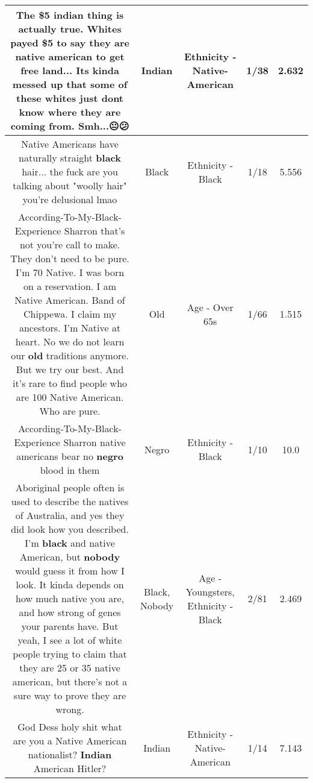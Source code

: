 \documentclass[11pt]{article}
\newlength\mylength
\begin{document}
\begin{center}
\begin{longtable}{|C{.65\mylength}|C{.30\mylength}|C{.12\mylength}|C{.12\mylength}|C{.12\mylength}|}
  \small The \$5 \textbf{indian} thing is actually true. Whites payed \$5 to say they are native american to get free land... Its kinda messed up that some of these whites just dont know where they are coming from. Smh...😐😕\normalsize   & Indian & Ethnicity - Native-American & 1/38 & 2.632 \\  \hline
  \small Native Americans have naturally straight \textbf{black} hair... the fuck are you talking about "woolly hair" you're delusional lmao\normalsize   & Black & Ethnicity - Black & 1/18 & 5.556 \\  \hline
  \small According-To-My-Black-Experience Sharron that's not you're call to make. They don't need to be pure. I'm 70 Native. I was born on a reservation. I am Native American. Band of Chippewa. I claim my ancestors. I'm Native at heart. No we do not learn our \textbf{old} traditions anymore. But we try our best. And it's rare to find people who are 100 Native American. Who are pure.\normalsize   & Old & Age - Over 65s & 1/66 & 1.515 \\  \hline
  \small According-To-My-Black-Experience Sharron native americans bear no \textbf{negro} blood in them\normalsize   & Negro & Ethnicity - Black & 1/10 & 10.0 \\  \hline
  \small Aboriginal people often is used to describe the natives of Australia, and yes they did look how you described. I'm \textbf{black} and native American, but \textbf{nobody} would guess it from how I look. It kinda depends on how much native you are, and how strong of genes your parents have. But yeah, I see a lot of white people trying to claim that they are 25 or 35 native american, but there's not a sure way to prove they are wrong.\normalsize   & Black, Nobody & Age - Youngsters, Ethnicity - Black & 2/81 & 2.469 \\  \hline
  \small God Dess holy shit what are you a Native American nationalist? \textbf{Indian} American Hitler?\normalsize   & Indian & Ethnicity - Native-American & 1/14 & 7.143 \\  \hline

\end{longtable}
\end{center}
\end{document}
